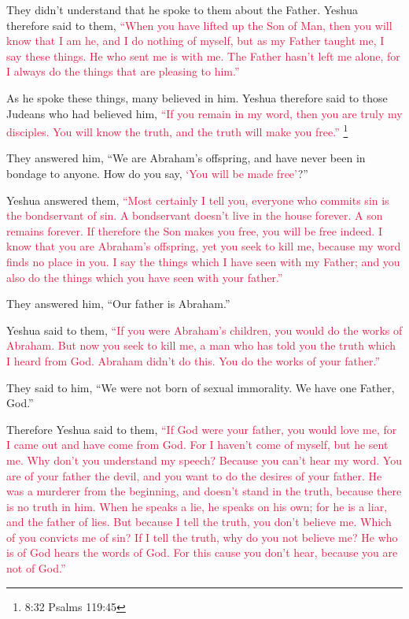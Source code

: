 \myverse{}They didn’t understand that he spoke to them about the Father.
\myverse{}Yeshua therefore said to them,
\textcolor{crimson}{“When you have lifted up the Son of Man, then you will know that I am he, and I do nothing of myself,
	but as my Father taught me, I say these things.
}
\myverse{}\textcolor{crimson}{He who sent me is with me. The Father hasn’t left me alone, for I always
	do the things that are pleasing to him.”}

\myverse{}As he spoke these things, many believed in him.
\myverse{}Yeshua therefore said to those Judeans who had believed him,
\textcolor{crimson}{“If you remain in my word, then you are truly my disciples.
}
\myverse{}\textcolor{crimson}{You will know the truth, and the truth will make you free.”
}\footnote{8:32 Psalms 119:45}

\myverse{}They answered him, “We are Abraham’s offspring, and have never
been in bondage to anyone. How do you say,
\textcolor{crimson}{‘You will be made free’}?”

\myverse{}Yeshua answered them,
\textcolor{crimson}{“Most certainly I tell you, everyone who commits sin is the bondservant of sin.
}
\myverse{}\textcolor{crimson}{A bondservant doesn’t live in the house forever. A son remains forever.
}
\myverse{}\textcolor{crimson}{If therefore the Son makes you free, you will be free indeed.
}
\myverse{}\textcolor{crimson}{I know that you are Abraham’s offspring, yet you seek to kill me, because
	my word finds no place in you.
}
\myverse{}\textcolor{crimson}{I say the things which I have seen with my Father; and you also do the
	things which you have seen with your father.”}

\myverse{}They answered him, “Our father is Abraham.”

Yeshua said to them,
\textcolor{crimson}{“If you were Abraham’s children, you would do the works of Abraham.
}
\myverse{}\textcolor{crimson}{But now you seek to kill me, a man who has told you the truth which I
	heard from God. Abraham didn’t do this.
}
\myverse{}\textcolor{crimson}{You do the works of your father.”}

They said to him, “We were not born of sexual immorality. We have one Father, God.”

\myverse{}Therefore Yeshua said to them,
\textcolor{crimson}{“If God were your father, you would love me, for I came out and have come from God. For I haven’t
	come of myself, but he sent me.
}
\myverse{}\textcolor{crimson}{Why don’t you understand my speech? Because you can’t hear my word.
}
\myverse{}\textcolor{crimson}{You are of your father the devil, and you want to do the desires of your
	father. He was a murderer from the beginning, and doesn’t stand in the truth, because there is no truth
	in him. When he speaks a lie, he speaks on his own; for he is a liar, and the father of lies.
}
\myverse{}\textcolor{crimson}{But because I tell the truth, you don’t believe me.
}
\myverse{}\textcolor{crimson}{Which of you convicts me of sin? If I tell the truth, why do you not believe
	me?
}
\myverse{}\textcolor{crimson}{He who is of God hears the words of God. For this cause you don’t hear,
	because you are not of God.”}

